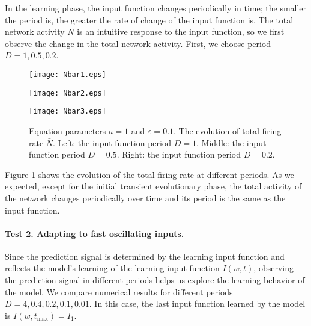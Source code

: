 In the learning phase, the input function changes periodically in time; the smaller the period is, the greater the rate of change of the input function is. The total network activity $\bar{N}$ is an intuitive response to the input function, so we first observe the change in the total network activity. First, we choose period $D=1,0.5,0.2$. 
\begin{figure}[!htb]
    \centering
        \begin{minipage}[c]{0.3\textwidth}
            \centering
            \texttt{[image: Nbar1.eps]}
        \end{minipage}
        \begin{minipage}[c]{0.3\textwidth}
            \centering
            \texttt{[image: Nbar2.eps]}
        \end{minipage}
        \begin{minipage}[c]{0.3\textwidth}
            \centering
            \texttt{[image: Nbar3.eps]}
        \end{minipage}
    \caption{Equation parameters $a=1$ and $\varepsilon=0.1$. The evolution of total firing rate $\bar{N}$. Left: the input function period $D=1$. Middle: the input function period $D=0.5$. Right: the input function period $D=0.2$.}
    \label{fig:Nbar}
\end{figure}

Figure \ref{fig:Nbar} shows the evolution of the total firing rate at different periods. As we expected, except for the initial transient evolutionary phase, the total activity of the network changes periodically over time and its period is the same as the input function.



\paragraph{Test 2. Adapting to fast oscillating inputs.}
Since the prediction signal is determined by the learning input function and reflects the model's learning of the learning input function $I(w,t)$, observing the prediction signal in different periods helps us explore the learning behavior of the model. We compare numerical results for different periods $D=4,0.4,0.2,0.1,0.01$.  In this case, the last input function learned by the model is $I(w,t_\text{max})=I_1$.



